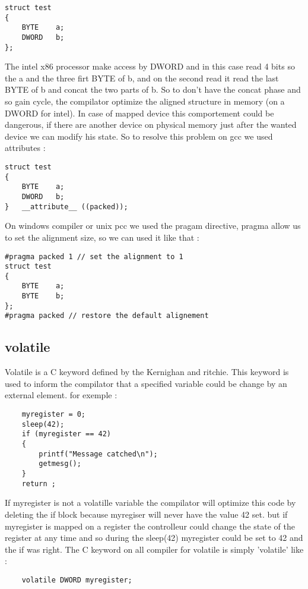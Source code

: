 \documentclass[11pt]{report}
\begin{document}
\begin{lstlisting}
struct test 
{
	BYTE	a;
	DWORD	b;
};
\end{lstlisting}

The intel x86 processor make access by DWORD and in this case read 4 bits so the a and the three 
firt BYTE of b, and on the second read it read the last BYTE of b and concat the two parts of b. 
So to don't have the concat phase and so gain cycle, the compilator optimize the aligned structure 
in memory (on a DWORD for intel). In case of mapped device this comportement could be dangerous, 
if there are another device on physical memory just after the wanted device we can modify his state. 
So to resolve this problem on gcc we used attributes : 
\begin{lstlisting}
struct test
{
	BYTE	a;
	DWORD	b;
}	__attribute__ ((packed));
\end{lstlisting}
On windows compiler or unix pcc we used the pragam directive, pragma allow us to set the alignment 
size, so we can used it like that : 
\begin{lstlisting}
#pragma packed 1 // set the alignment to 1
struct test
{
	BYTE	a;
	BYTE	b;
};
#pragma packed // restore the default alignement
\end{lstlisting}

\subsection{volatile}
Volatile is a C keyword defined by the Kernighan and ritchie. This keyword is used to inform the 
compilator that a specified variable could be change by an external element. for exemple :
\begin{lstlisting}
	myregister = 0;
	sleep(42);
	if (myregister == 42)
	{
		printf("Message catched\n");
		getmesg();
	}
	return ;
\end{lstlisting}

If myregister is not a volatille variable the compilator will optimize this code by deleting the if
block because myregiser will never have the value 42 set. but if myregister is mapped on a register
the controlleur could change the state of the register at any time and so during the sleep(42) myregister 
could be set to 42 and the if was right. The C keyword on all compiler for volatile is simply 'volatile' like : 

\begin{lstlisting}
	volatile DWORD myregister;
\end{lstlisting}
\end{document}
